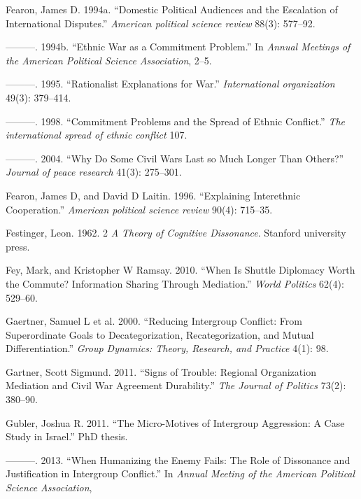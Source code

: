 \documentclass[11pt]{article}
\begin{document}
\hypertarget{ref-fearon1994domestic}{}
Fearon, James D. 1994a. ``Domestic Political Audiences and the
Escalation of International Disputes.'' \emph{American political science
review} 88(3): 577--92.

\hypertarget{ref-fearon1994ethnic}{}
---------. 1994b. ``Ethnic War as a Commitment Problem.'' In
\emph{Annual Meetings of the American Political Science Association},
2--5.

\hypertarget{ref-fearon1995rationalist}{}
---------. 1995. ``Rationalist Explanations for War.''
\emph{International organization} 49(3): 379--414.

\hypertarget{ref-fearon1998commitment}{}
---------. 1998. ``Commitment Problems and the Spread of Ethnic
Conflict.'' \emph{The international spread of ethnic conflict} 107.

\hypertarget{ref-fearon2004civil}{}
---------. 2004. ``Why Do Some Civil Wars Last so Much Longer Than
Others?'' \emph{Journal of peace research} 41(3): 275--301.

\hypertarget{ref-fearon1996explaining}{}
Fearon, James D, and David D Laitin. 1996. ``Explaining Interethnic
Cooperation.'' \emph{American political science review} 90(4): 715--35.

\hypertarget{ref-festinger1962cognitiveDissonance}{}
Festinger, Leon. 1962. 2 \emph{A Theory of Cognitive Dissonance}.
Stanford university press.

\hypertarget{ref-fey2010shuttle}{}
Fey, Mark, and Kristopher W Ramsay. 2010. ``When Is Shuttle Diplomacy
Worth the Commute? Information Sharing Through Mediation.'' \emph{World
Politics} 62(4): 529--60.

\hypertarget{ref-gaertner2000reducing}{}
Gaertner, Samuel L et al. 2000. ``Reducing Intergroup Conflict: From
Superordinate Goals to Decategorization, Recategorization, and Mutual
Differentiation.'' \emph{Group Dynamics: Theory, Research, and Practice}
4(1): 98.

\hypertarget{ref-gartner2011signs}{}
Gartner, Scott Sigmund. 2011. ``Signs of Trouble: Regional Organization
Mediation and Civil War Agreement Durability.'' \emph{The Journal of
Politics} 73(2): 380--90.

\hypertarget{ref-gubler2011diss}{}
Gubler, Joshua R. 2011. ``The Micro-Motives of Intergroup Aggression: A
Case Study in Israel.'' PhD thesis.

\hypertarget{ref-gubler2013humanizing}{}
---------. 2013. ``When Humanizing the Enemy Fails: The Role of
Dissonance and Justification in Intergroup Conflict.'' In \emph{Annual
Meeting of the American Political Science Association},
\end{document}
